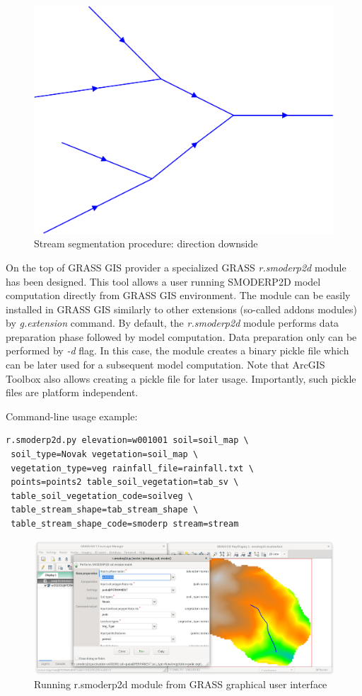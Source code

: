 \begin{figure}[ht!]
  \begin{center}
    \includegraphics[width=0.6\columnwidth]{figures/stream_next_edge}
    \caption{Stream segmentation procedure: direction downside}
    \label{fig:uml_diagram}
  \end{center}
\end{figure}

On the top of GRASS GIS provider a specialized GRASS {\em r.smoderp2d}
module has been designed. This tool allows a user running SMODERP2D
model computation directly from GRASS GIS environment. The module can
be easily installed in GRASS GIS similarly to other extensions
(so-called addons modules) by {\em g.extension} command. By default,
the {\em r.smoderp2d} module performs data preparation phase followed by
model computation. Data preparation only can be performed by {\em -d}
flag. In this case, the module creates a binary pickle file which can
be later used for a subsequent model computation. Note that ArcGIS
Toolbox also allows creating a pickle file for later
usage. Importantly, such pickle files are platform independent.

Command-line usage example:
\begin{verbatim}
r.smoderp2d.py elevation=w001001 soil=soil_map \
 soil_type=Novak vegetation=soil_map \
 vegetation_type=veg rainfall_file=rainfall.txt \
 points=points2 table_soil_vegetation=tab_sv \
 table_soil_vegetation_code=soilveg \
 table_stream_shape=tab_stream_shape \
 table_stream_shape_code=smoderp stream=stream 
\end{verbatim}

\begin{figure}[ht!]
  \begin{center}
    \includegraphics[width=1.0\columnwidth]{figures/smoderp2d_grass.png}
    \caption{Running r.smoderp2d module from GRASS graphical user interface}
    \label{fig:uml_diagram}
  \end{center}
\end{figure}

